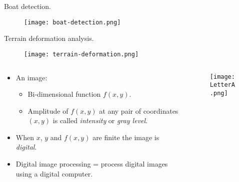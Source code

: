 


\begin{frame}
Boat detection.
\begin{figure}
\centering
\texttt{[image: boat-detection.png]}
\end{figure}
\end{frame}


\begin{frame}
Terrain deformation analysis.
\begin{figure}
\centering
\texttt{[image: terrain-deformation.png]}
\end{figure}
\end{frame}


\begin{frame}
\begin{columns}[T]
\begin{column}{.6\textwidth}
\begin{itemize}
\item An image:
\begin{itemize}
\item Bi-dimensional function $f(x,y)$.
\item Amplitude of $f(x,y)$ at any pair of coordinates $(x,y)$ is called \textit{intensity} or \textit{gray level}.
\end{itemize}
\item When $x$, $y$ and $f(x,y)$ are finite	the image is \textit{digital}.
\item Digital image processing = process digital images using a digital computer.
\end{itemize}
\end{column}
\begin{column}{.4\textwidth}
\begin{figure}
\texttt{[image: LetterA.png]}
\end{figure}
\end{column}
\end{columns}
\end{frame}

